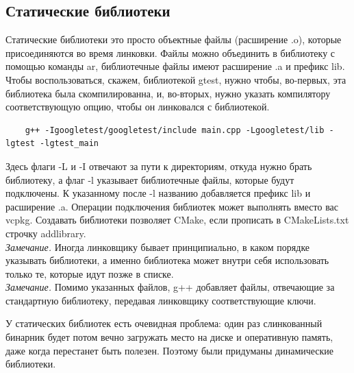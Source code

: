 \documentclass[12pt, a4paper]{article}
\begin{document}
\subsection{Статические библиотеки}
Статические библиотеки это просто объектные файлы (расширение .o), которые присоединяются во время линковки. Файлы можно объединить в библиотеку с помощью команды ar, библиотечные файлы имеют расширение .a и префикс lib. Чтобы воспользоваться, скажем, библиотекой gtest, нужно чтобы, во-первых, эта библиотека была скомпилированна, и, во-вторых, нужно указать компилятору соответствующую опцию, чтобы он линковался с библиотекой.
\begin{verbatim}
	g++ -Igoogletest/googletest/include main.cpp -Lgoogletest/lib -lgtest -lgtest_main
\end{verbatim}
Здесь флаги -L и -I отвечают за пути к директориям, откуда нужно брать библиотеку, а флаг -l указывает библиотечные файлы, которые будут подключены. К указанному после -l названию добавляется префикс lib и расширение .a. Операции подключения библиотек может выполнять вместо вас vcpkg. Создавать библиотеки позволяет CMake, если прописать в CMakeLists.txt строчку add\textunderscore library.\\
\textit{Замечание.} Иногда линковщику бывает принципиально, в каком порядке указывать библиотеки, а именно библиотека может внутри себя использовать только те, которые идут позже в списке.\\
\textit{Замечание.} Помимо указанных файлов, g++ добавляет файлы, отвечающие за стандартную библиотеку, передавая линковщику соответствующие ключи.\\
\par У статических библиотек есть очевидная проблема: один раз слинкованный бинарник будет потом вечно загружать место на диске и оперативную память, даже когда перестанет быть полезен. Поэтому были придуманы динамические библиотеки.
\end{document}
